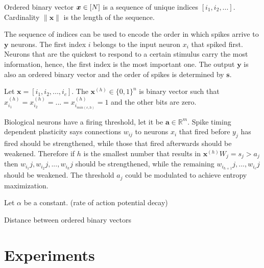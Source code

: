 \documentclass[oneside,english,logo]{amuthesis}
\begin{document}
\begin{definition}
Ordered binary vector $\boldsymbol{x}\in [\boldmath{N}]$ is a sequence of unique indices $[i_1,i_2,...]$. Cardinality $\lVert \boldsymbol{x} \rVert$ is the length of the sequence.
\end{definition}
The sequence of indices can be used to encode the order in which spikes arrive to $\boldsymbol{y}$ neurons. The first index $i$ belongs to the input neuron $x_i$ that spiked first. Neurons that are the quickest to respond to a certain stimulus  carry the most information, hence, the first index is the most important one. The output $\boldsymbol{y}$ is also an ordered binary vector and the order of spikes is determined by $\boldsymbol{s}$.
\begin{definition}
Let $\boldsymbol{x}=[i_1,i_2,...,i_c]$.
The $\boldsymbol{x}^{(h)}\in \{0,1\}^n$ is binary vector such that $x^{(h)}_{i_1}=x^{(h)}_{i_2}=...=x^{(h)}_{i_{min(c,h)}}=1$ and the other bits are zero.
\end{definition}
Biological neurons have a firing threshold, let it be $\boldsymbol{a}\in \mathbb{R}^m$. Spike timing dependent plasticity says connections $w_{ij}$ to neurons $x_i$ that fired before $y_j$ has fired should be strengthened, while those that fired afterwards should be weakened. Therefore if $h$ is the smallest number that results in $\boldsymbol{x}^{(h)} W_j = s_j > a_j$ then $w_{i_1}j,w_{i_2}j,...,w_{i_h}j$ should be strengthened, while the remaining $w_{i_{h+1}}j,...,w_{i_c}j$ should be weakened. The threshold $a_j$ could be modulated to achieve entropy maximization. 

\begin{definition}
Let $\alpha$ be a constant. (rate of action potential decay)
\end{definition}
\begin{definition}
Distance between ordered binary vectors 
\end{definition}




\iffalse
\section{Experiments}
\end{document}
